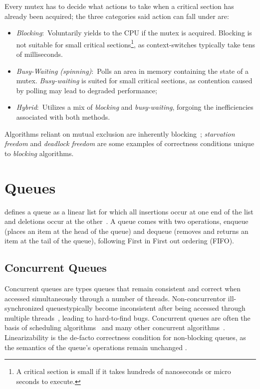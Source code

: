 Every mutex has to decide what actions to take when a critical section has
already been acquired; the three categories said action can fall under are: 
\begin{itemize}
\item \emph{Blocking}:~Voluntarily yields to the CPU if the mutex is acquired.
Blocking is not suitable for small critical sections\footnote{A critical
section is small if it takes hundreds of nanoseconds or micro seconds to
execute.}, as context-switches typically take tens of milliseconds.
\item \emph{Busy-Waiting (spinning)}:~Polls an area in memory containing the
state of a mutex. \emph{Busy-waiting} is suited for small critical sections, as
contention caused by polling may lead to degraded performance;
\item \emph{Hybrid}:~Utilizes a mix of \emph{blocking} and \emph{busy-waiting},
forgoing the inefficiencies associated with both methods.
\end{itemize}

Algorithms reliant on mutual exclusion are inherently
blocking~\citep[Section~3.8]{herlihy2020art}; \emph{starvation freedom} and
\emph{deadlock freedom} are some examples of correctness conditions unique to
\emph{blocking} algorithms.


\section{Queues}
\citeauthor{knuth1968art} defines a queue as a linear list for which all
insertions occur at one end of the list and deletions occur at the
other~\citep{knuth1968art}. A queue comes with two operations, enqueue (places
an item at the head of the queue) and dequeue (removes and returns an item at
the tail of the queue), following First in First out ordering (FIFO).

\subsection{Concurrent Queues}
Concurrent queues are types queues that remain consistent and correct when
accessed simultaneously through a number of threads. Non-concurrent\textemdash or
ill-synchronized queues\textemdash typically become inconsistent after being
accessed through multiple threads~\citep{yahav2003automatically}, leading
to hard-to-find bugs. Concurrent queues are often the basis of scheduling
algorithms~\citep{debattista2002high} and many other concurrent
algorithms~\citep{yahav2003automatically}. Linearizability is the de-facto correctness condition
for non-blocking queues, as the semantics of the queue's
operations remain unchanged \citep{mellor1987concurrent, valois1995datastructures}.

